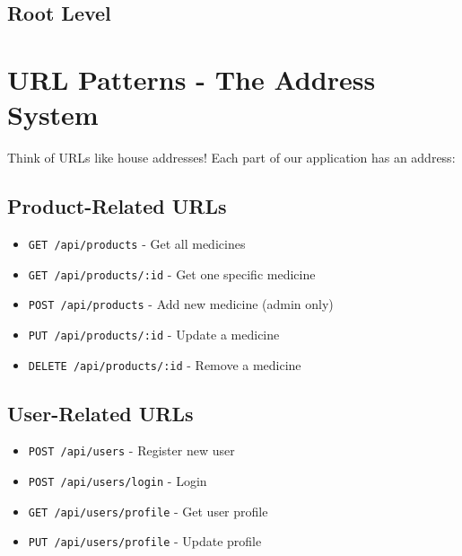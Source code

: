 \documentclass[12pt]{article}
\begin{document}
\subsection{Root Level}

\begin{center}
\end{center}

\section{URL Patterns - The Address System}

Think of URLs like house addresses! Each part of our application has an address:

\subsection{Product-Related URLs}

\begin{itemize}
    \item \texttt{GET /api/products} - Get all medicines
    \item \texttt{GET /api/products/:id} - Get one specific medicine
    \item \texttt{POST /api/products} - Add new medicine (admin only)
    \item \texttt{PUT /api/products/:id} - Update a medicine
    \item \texttt{DELETE /api/products/:id} - Remove a medicine
\end{itemize}

\subsection{User-Related URLs}

\begin{itemize}
    \item \texttt{POST /api/users} - Register new user
    \item \texttt{POST /api/users/login} - Login
    \item \texttt{GET /api/users/profile} - Get user profile
    \item \texttt{PUT /api/users/profile} - Update profile
\end{itemize}
\end{document}
